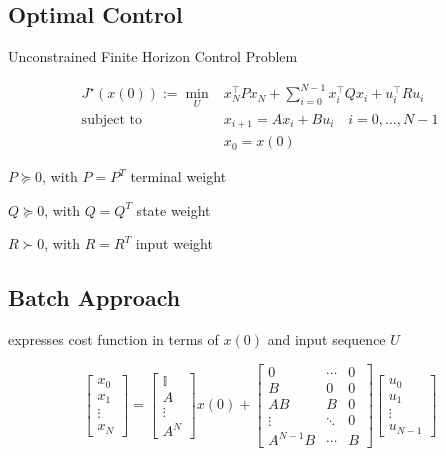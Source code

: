 
\subsection{Optimal Control}


Unconstrained Finite Horizon Control Problem

$$\begin{aligned}
		J^\star(x(0)) :=
		\min_U & x_N^\top P x_N +
		\textstyle\sum_{i=0}^{N-1}
		x_i^\top Q x_i + u_i^\top R u_i
		\\
		\text{subject to  }
		       & x_{i+1}                = Ax_i+Bu_i
		\quad i  = 0,\dots,N-1                      \\
		       & x_0                    = x(0)
	\end{aligned}$$

$P\succeq0$, with $P=P^T$
terminal weight

$Q\succeq0$, with $Q = Q^T$
state weight

$R\succ0$, with $R = R^T$
input weight

\subsection{Batch Approach}

expresses cost function in terms of $x(0)$ and input sequence $U$

\[ \begin{bmatrix}
		x_0    \\
		x_1    \\
		\vdots \\
		x_N
	\end{bmatrix}
	=
	\begin{bmatrix}
		\mathbb{I} \\
		A          \\
		\vdots     \\
		A^N
	\end{bmatrix}
	x(0) +
	\begin{bmatrix}
		0        & \cdots & 0 \\
		B        & 0      & 0 \\
		AB       & B      & 0 \\
		\vdots   & \ddots & 0 \\
		A^{N-1}B & \cdots & B
	\end{bmatrix}
	\begin{bmatrix}
		u_0    \\
		u_1    \\
		\vdots \\
		u_{N-1}
	\end{bmatrix} \]


